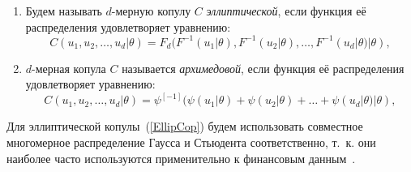 \begin{enumerate}[label=(\arabic*),labelwidth=1cm,leftmargin=1cm]
\item 
Будем называть $d$-мерную копулу $C$ \textit{эллиптической}, если функция её распределения удовлетворяет уравнению:
\begin{equation} \label{EllipCop}
    C(u_1, u_2, \ldots,u_d|\theta) = F_d(F^{-1}(u_1|\theta),F^{-1}(u_2|\theta), \ldots,F^{-1}(u_d|\theta)|\theta),
\end{equation}
\item $d$-мерная копула $C$ называется \textit{архимедовой}, если функция её распределения удовлетворяет уравнению:
\begin{equation} \label{ArchCop}
    C(u_1,u_2,\ldots,u_d|\theta) = \psi^{[-1]}(\psi(u_1|\theta)+\psi(u_2|\theta) + \ldots + \psi(u_d|\theta) | \theta ),
\end{equation}
\end{enumerate}

Для эллиптической копулы~(\ref{EllipCop}) будем использовать совместное многомерное распределение Гаусса и Стьюдента соответственно, т.~к. они наиболее часто используются применительно к финансовым данным~\cite{Lourme2016}.

